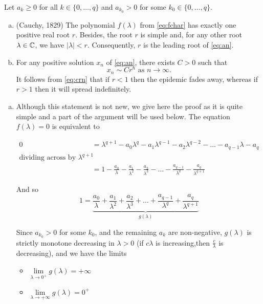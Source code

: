 \begin{theorem}\label{thm:lim}
Let $a_k \geq 0$ for all $k \in \{0,\dots,q\}$ and $a_{k_0} > 0$ for some $k_0\in \{0,\dots,q\}$.
\begin{enumerate}[(a)]
    \item (Cauchy, 1829) The polynomial $f(\lambda)$ from \ref{eq:fchar} has exactly one positive real root $r$. Besides, the root $r$ is simple and, for any other root $\lambda \in \mathbb C$, we have $|\lambda| < r$. Consequently, $r$ is the leading root of \ref{eq:an}.
    \item For any positive solution $x_n$ of \ref{eq:an}, there exists $C > 0$ such that
    \begin{equation}\label{eq:crn}
        x_n \sim Cr^n \text{ as } n\to\infty.
    \end{equation}
    It follows from \ref{eq:crn} that if $r < 1$ then the epidemic fades away, whereas if $r > 1$ then it will spread indefinitely.
\end{enumerate}
\begin{pf}
\begin{enumerate}[(a)]
\item Although this statement is not new, we give here the proof as it is quite simple and a part of the argument will be used below. The equation $f(\lambda) = 0$ is equivalent to

$\begin{aligned}
0 &= \lambda^{q+1} - a_0\lambda^q - a_1\lambda^{q-1} - a_2\lambda^{q-2} - \dots - a_{q-1}\lambda - a_q \\
\text{dividing across by } \lambda^{q+1} \\
  &= 1 - \frac{a_0}{\lambda} - \frac{a_1}{\lambda^2} - \frac{a_2}{\lambda^3}-\dots - \frac{a_{q-1}}{\lambda^q} -\frac{a_q}{\lambda^{q+1}}
\end{aligned}$
    
And so
\begin{equation} \label{eq:glambda}
1 =\underbrace{\frac{a_0}{\lambda} + \frac{a_1}{\lambda^2} + \frac{a_2}{\lambda^3}+\dots + \frac{a_{q-1}}{\lambda^q} +\frac{a_q}{\lambda^{q+1}}}_{g(\lambda)}    
\end{equation}

Since $a_{k_0} > 0$ for some $k_0$, and the remaining $a_k$ are non-negative, $g(\lambda)$ is strictly monotone decreasing in $\lambda > 0$ (if $c\lambda$ is increasing,then $\frac{c}\lambda$ is decreasing),  and we have the limits
\begin{itemize}
    \item $\lim\limits_{\lambda\to0^+}g(\lambda)=+\infty$
    \item $\lim\limits_{\lambda\to+\infty}g(\lambda)=0^+$
\end{itemize}


\end{enumerate}
\end{pf}
\end{theorem}
